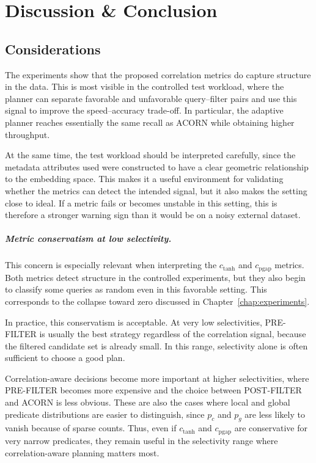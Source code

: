 \chapter{Discussion \& Conclusion}\label{chap:discussion-conclusion}
\section{Considerations}

The experiments show that the proposed correlation metrics do capture structure in the data.
This is most visible in the controlled test workload, where the planner can separate favorable and unfavorable query--filter pairs and use this signal to improve the speed--accuracy trade-off.
In particular, the adaptive planner reaches essentially the same recall as ACORN while obtaining higher throughput.

At the same time, the test workload should be interpreted carefully, since the metadata attributes used were constructed to have a clear geometric relationship to the embedding space.
This makes it a useful environment for validating whether the metrics can detect the intended signal, but it also makes the setting close to ideal.
If a metric fails or becomes unstable in this setting, this is therefore a stronger warning sign than it would be on a noisy external dataset.

\paragraph{Metric conservatism at low selectivity.}

This concern is especially relevant when interpreting the \(c_{\mathrm{tanh}}\) and \(c_{\mathrm{pgap}}\) metrics.
Both metrics detect structure in the controlled experiments, but they also begin to classify some queries as random even in this favorable setting.
This corresponds to the collapse toward zero discussed in Chapter~\ref{chap:experiments}.

In practice, this conservatism is acceptable.
At very low selectivities, PRE-FILTER is usually the best strategy regardless of the correlation signal, because the filtered candidate set is already small.
In this range, selectivity alone is often sufficient to choose a good plan.

Correlation-aware decisions become more important at higher selectivities, where PRE-FILTER becomes more expensive and the choice between POST-FILTER and ACORN is less obvious.
These are also the cases where local and global predicate distributions are easier to distinguish, since \(p_c\) and \(p_g\) are less likely to vanish because of sparse counts.
Thus, even if \(c_{\mathrm{tanh}}\) and \(c_{\mathrm{pgap}}\) are conservative for very narrow predicates, they remain useful in the selectivity range where correlation-aware planning matters most.

